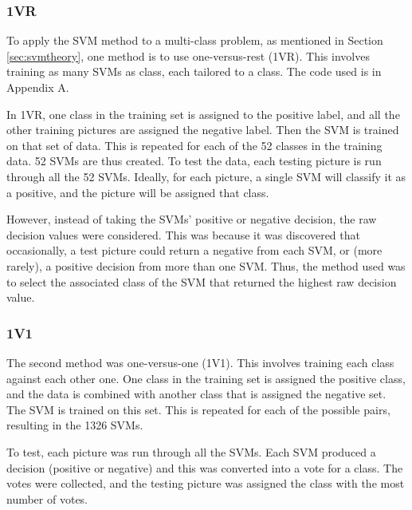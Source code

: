 \documentclass[a4paper, 10pt, conference]{ieeeconf}
\begin{document}
\subsubsection{1VR}
To apply the SVM method to a multi-class problem, as mentioned in Section \ref{sec:svmtheory}, one method is to use one-versus-rest (1VR). This involves training as many SVMs as class, each tailored to a class. The code used is in Appendix A.

In 1VR, one class in the training set is assigned to the positive label, and all the other training pictures are assigned the negative label. Then the SVM is trained on that set of data. This is repeated for each of the 52 classes in the training data. 52 SVMs are thus created. To test the data, each testing picture is run through all the 52 SVMs. Ideally, for each picture, a single SVM will classify it as a positive, and the picture will be assigned that class.

However, instead of taking the SVMs' positive or negative decision, the raw decision values were considered. This was because it was discovered that occasionally, a test picture could return a negative from each SVM, or (more rarely), a positive decision from more than one SVM. Thus, the method used was to select the associated class of the SVM that returned the highest raw decision value.

\subsubsection{1V1}
The second method was one-versus-one (1V1). This involves training each class against each other one. One class in the training set is assigned the positive class, and the data is combined with another class that is assigned the negative set. The SVM is trained on this set. This is repeated for each of the possible pairs, resulting in the 1326 SVMs.

To test, each picture was run through all the SVMs. Each SVM produced a decision (positive or negative) and this was converted into a vote for a class. The votes were collected, and the testing picture was assigned the class with the most number of votes.

\end{document}
